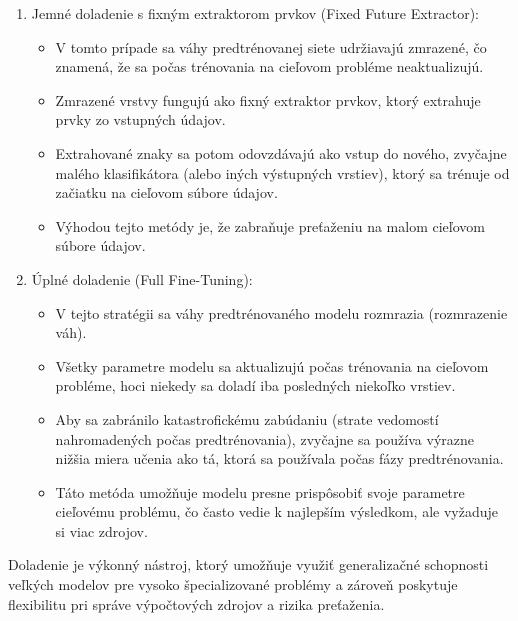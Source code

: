 \documentclass[]{tukediphc}
\begin{document}
\begin{enumerate}
\item Jemné doladenie s fixným extraktorom prvkov (Fixed Future Extractor):

\begin{itemize}
\item V tomto prípade sa váhy predtrénovanej siete udržiavajú zmrazené, čo znamená, že sa počas trénovania na cieľovom probléme neaktualizujú.

\item Zmrazené vrstvy fungujú ako fixný extraktor prvkov, ktorý extrahuje prvky zo vstupných údajov\cite{researchgate:fine_tuning_transfer_learning}.

\item Extrahované znaky sa potom odovzdávajú ako vstup do nového, zvyčajne malého klasifikátora (alebo iných výstupných vrstiev), ktorý sa trénuje od začiatku na cieľovom súbore údajov.

\item Výhodou tejto metódy je, že zabraňuje preťaženiu na malom cieľovom súbore údajov.
\end{itemize}

\item Úplné doladenie (Full Fine-Tuning):
\begin{itemize}
\item V tejto stratégii sa váhy predtrénovaného modelu rozmrazia (rozmrazenie váh).

\item Všetky parametre modelu sa aktualizujú počas trénovania na cieľovom probléme, hoci niekedy sa doladí iba posledných niekoľko vrstiev.

\item Aby sa zabránilo katastrofickému zabúdaniu (strate vedomostí nahromadených počas predtrénovania), zvyčajne sa používa výrazne nižšia miera učenia ako tá, ktorá sa používala počas fázy predtrénovania.

\item Táto metóda umožňuje modelu presne prispôsobiť svoje parametre cieľovému problému, čo často vedie k najlepším výsledkom, ale vyžaduje si viac zdrojov.
\end{itemize}
\end{enumerate}

Doladenie je výkonný nástroj, ktorý umožňuje využiť generalizačné schopnosti veľkých modelov pre vysoko špecializované problémy a zároveň poskytuje flexibilitu pri správe výpočtových zdrojov a rizika preťaženia.
\end{document}
